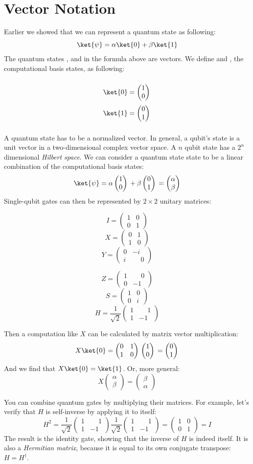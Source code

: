\documentclass[11pt, notitlepage]{report}
\newcommand{\igate}{
  \begin{pmatrix}
  1 & 0 \\
  0 & 1
  \end{pmatrix}
}
\newcommand{\xgate}{
  \begin{pmatrix}
  0 & 1 \\
  1 & 0
  \end{pmatrix}
}
\newcommand{\ygate}{
  \begin{pmatrix}
  0 & -i \\
  i & \phantom{-}0
  \end{pmatrix}
}
\newcommand{\zgate}{
  \begin{pmatrix}
  1 & \phantom{-}0 \\
  0 & -1
  \end{pmatrix}
}
\newcommand{\hgate}{
  \dfrac{1}{\sqrt2}
  \begin{pmatrix}
  1 & \phantom{-}1 \\
  1 & -1
  \end{pmatrix}
}
\newcommand{\sgate}{
  \begin{pmatrix}
  1 & 0 \\
  0 & i
  \end{pmatrix}
}
\newcommand{\qstatezero}{
  \begin{pmatrix}1 \\ 0\end{pmatrix}
}
\newcommand{\qstateone}{
  \begin{pmatrix}0 \\ 1\end{pmatrix}
}
\begin{document}
\section{Vector Notation} \label{sec:matrix_notation}
Earlier we showed that we can represent a quantum state as following:
\[\ket{\psi} = \alpha\ket{0} + \beta\ket{1}\]
The quantum states \ket{\psi},  and  in the formula above are vectors. We define  and , the computational basis states, as following:
\setlength\multicolsep{0pt}
\begin{multicols}{4}
  \hfill
  \[\]
  \break
  \[\ket{0} = \qstatezero{}\]
  \break
  \[\ket{1} = \qstateone{}\]
  \break
  \[\]
  \hfill
\end{multicols}
\noindent
A quantum state has to be a normalized vector. In general, a qubit's state is a unit vector in a two-dimensional complex vector space. A $n$ qubit state has a $2^n$ dimensional \emph{Hilbert space}. We can consider a quantum state state to be a linear combination of the computational basis states:
\[
  \ket{\psi} = \alpha\qstatezero{} + \beta\qstateone{} = \begin{pmatrix}\alpha \\ \beta\end{pmatrix}
\]
Single-qubit gates can then be represented by $2 \times 2$ unitary matrices:
\vspace*{-4mm}
\setlength\multicolsep{0pt}
\begin{multicols}{3}
  \[
    I = \igate{}
  \]
  \vfill
  \[
    X = \xgate{}
  \]
  \vfill
  \[
    Y = \ygate{}
  \]
\end{multicols}

\begin{multicols}{3}
  \[
    Z = \zgate{}
  \]
  \vfill
  \[
    S = \sgate{}
  \]
  \vfill
  \[
    H = \hgate{}
  \]
\end{multicols}
\bigskip
\noindent
Then a computation like $X$ can be calculated by matrix vector multiplication:
\[
X\ket{0} = \xgate{} \qstatezero{} = \qstateone{}
\]
And we find that $X\ket{0} = \ket{1}$. Or, more general:
\[
  X\begin{pmatrix}\alpha \\ \beta\end{pmatrix} = \begin{pmatrix}\beta \\ \alpha\end{pmatrix}
\]

You can combine quantum gates by multiplying their matrices. For example, let's verify that $H$ is self-inverse by applying it to itself:
\[
  H^2 = \hgate{} \hgate{} = \igate{} = I
\]
The result is the identity gate, showing that the inverse of $H$ is indeed itself. It is also a \emph{Hermitian matrix}, because it is equal to its own conjugate transpose: $H = H^\dagger$.
\end{document}
